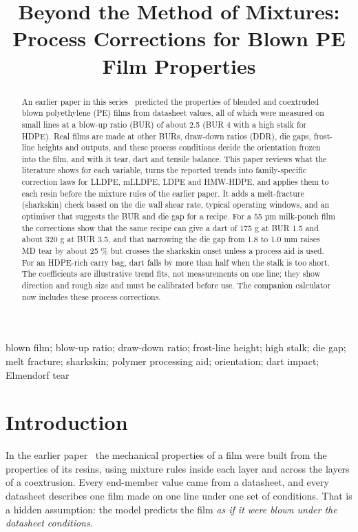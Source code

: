 \documentclass[conference,a4paper]{IEEEtran}
\begin{document}
\title{Beyond the Method of Mixtures: Process Corrections for Blown PE Film Properties}
\author{
}
\maketitle
\begin{abstract}
An earlier paper in this series~\cite{r1} predicted the properties of blended and coextruded blown polyethylene (PE) films from datasheet values, all of which were measured on small lines at a blow-up ratio (BUR) of about 2.5 (BUR 4 with a high stalk for HDPE). Real films are made at other BURs, draw-down ratios (DDR), die gaps, frost-line heights and outputs, and these process conditions decide the orientation frozen into the film, and with it tear, dart and tensile balance. This paper reviews what the literature shows for each variable, turns the reported trends into family-specific correction laws for LLDPE, mLLDPE, LDPE and HMW-HDPE, and applies them to each resin before the mixture rules of the earlier paper. It adds a melt-fracture (sharkskin) check based on the die wall shear rate, typical operating windows, and an optimiser that suggests the BUR and die gap for a recipe. For a 55 µm milk-pouch film the corrections show that the same recipe can give a dart of 175 g at BUR 1.5 and about 320 g at BUR 3.5, and that narrowing the die gap from 1.8 to 1.0 mm raises MD tear by about 25 \% but crosses the sharkskin onset unless a process aid is used. For an HDPE-rich carry bag, dart falls by more than half when the stalk is too short. The coefficients are illustrative trend fits, not measurements on one line; they show direction and rough size and must be calibrated before use. The companion calculator now includes these process corrections.
\end{abstract}
\begin{IEEEkeywords}
blown film; blow-up ratio; draw-down ratio; frost-line height; high stalk; die gap; melt fracture; sharkskin; polymer processing aid; orientation; dart impact; Elmendorf tear
\end{IEEEkeywords}
\section{Introduction}

In the earlier paper~\cite{r1} the mechanical properties of a film were built from the properties of its resins, using mixture rules inside each layer and across the layers of a coextrusion. Every end-member value came from a datasheet, and every datasheet describes one film made on one line under one set of conditions. That is a hidden assumption: the model predicts the film \emph{as if it were blown under the datasheet conditions}.
\end{document}
